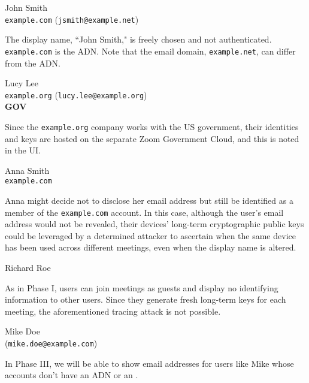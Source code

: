 \begin{multicols}{2}
John Smith \\
\texttt{example.com} (\texttt{jsmith@example.net})

\columnbreak

The display name, ``John Smith," is freely chosen and not authenticated. \texttt{example.com} is the
ADN\@. Note that the email domain, \texttt{example.net}, can differ from the ADN\@.
\end{multicols}

\begin{multicols}{2}
Lucy Lee \\
\texttt{example.org} (\texttt{lucy.lee@example.org}) \\ \textbf{GOV}

\columnbreak

Since the \texttt{example.org} company works with the US government, their identities and keys
are hosted on the separate Zoom Government Cloud, and this is noted in the UI.
\end{multicols}

\begin{multicols}{2}
Anna Smith \\
\texttt{example.com}

\columnbreak

Anna might decide not to disclose her email address but still be identified as a member of the
\texttt{example.com} account. In this case, although the user's email address would not be
revealed, their devices' long-term cryptographic public keys could be leveraged by a determined
attacker to ascertain when the same device has been used across different meetings, even when
the display name is altered.
\end{multicols}

\begin{multicols}{2}
Richard Roe

\columnbreak

As in Phase I, users can join meetings as guests and display no identifying information to
other users. Since they generate fresh long-term keys for each meeting, the aforementioned tracing
attack is not possible.
\end{multicols}

\begin{multicols}{2}
Mike Doe \\
(\texttt{mike.doe@example.com})

\columnbreak

In Phase III, we will be able to show email addresses for users like Mike whose accounts don't have
an ADN or an \idp.
\end{multicols}

